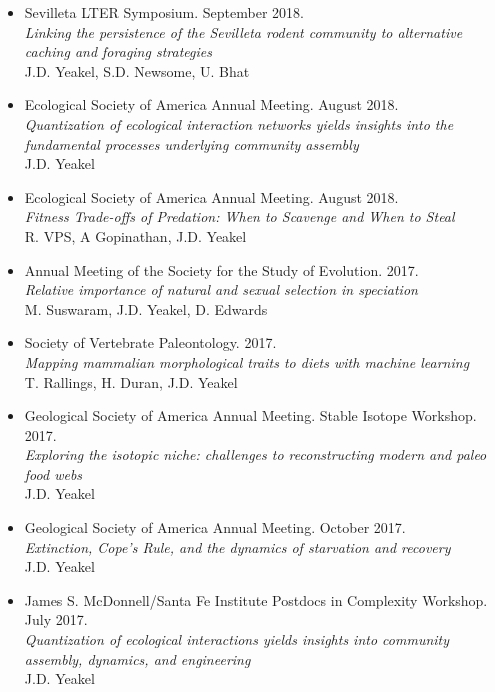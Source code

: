 \documentclass[margin,line,12pt]{res}
\begin{document}
\begin{resume}
\begin{itemize}
\item Sevilleta LTER Symposium. September 2018.\\
\emph{Linking the persistence of the Sevilleta rodent community to alternative caching and foraging strategies}\\
J.D. Yeakel, S.D. Newsome, U. Bhat

\item Ecological Society of America Annual Meeting. August 2018.\\
\emph{Quantization of ecological interaction networks yields insights into the fundamental processes underlying community assembly}\\
J.D. Yeakel

\item Ecological Society of America Annual Meeting. August 2018.\\
\emph{Fitness Trade-offs of Predation: When to Scavenge and When to Steal}\\
R. VPS, A Gopinathan, J.D. Yeakel

\item Annual Meeting of the Society for the Study of Evolution. 2017.\\
\emph{Relative importance of natural and sexual selection in speciation}\\
M. Suswaram, J.D. Yeakel, D. Edwards

\item Society of Vertebrate Paleontology. 2017.\\
\emph{Mapping mammalian morphological traits to diets with machine learning}\\
T. Rallings, H. Duran, J.D. Yeakel

\item Geological Society of America Annual Meeting. Stable Isotope Workshop. 2017.\\
\emph{Exploring the isotopic niche: challenges to reconstructing modern and paleo food
webs}\\
J.D. Yeakel

\item Geological Society of America Annual Meeting. October 2017.\\
\emph{Extinction, Cope's Rule, and the dynamics of starvation and recovery}\\
J.D. Yeakel

\item James S. McDonnell/Santa Fe Institute Postdocs in Complexity Workshop. July 2017.\\
\emph{Quantization of ecological interactions yields insights into community assembly, dynamics, and engineering}\\
J.D. Yeakel


\end{itemize}
\end{resume}
\end{document}
